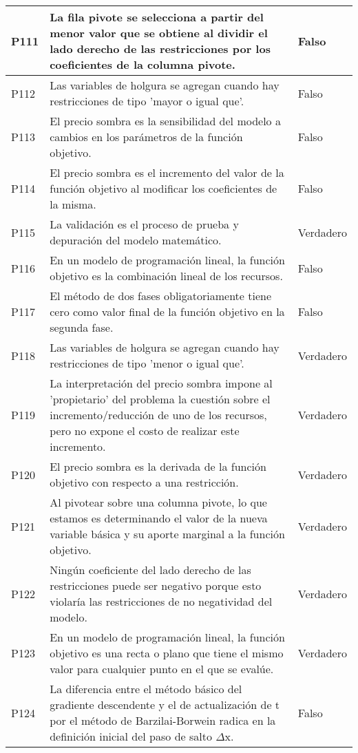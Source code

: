 \documentclass{article}
\begin{document}
\begin{longtable}{|p{1.5cm}|p{14cm}|p{2cm}|}
P111 & La fila pivote se selecciona a partir del menor valor que se obtiene al dividir el lado derecho de las restricciones por los coeficientes de la columna pivote. & Falso \\ \hline
P112 & Las variables de holgura se agregan cuando hay restricciones de tipo 'mayor o igual que'. & Falso \\ \hline
P113 & El precio sombra es la sensibilidad del modelo a cambios en los parámetros de la función objetivo. & Falso \\ \hline
P114 & El precio sombra es el incremento del valor de la función objetivo al modificar los coeficientes de la misma. & Falso \\ \hline
P115 & La validación es el proceso de prueba y depuración del modelo matemático. & Verdadero \\ \hline
P116 & En un modelo de programación lineal, la función objetivo es la combinación lineal de los recursos. & Falso \\ \hline
P117 & El método de dos fases obligatoriamente tiene cero como valor final de la función objetivo en la segunda fase. & Falso \\ \hline
P118 & Las variables de holgura se agregan cuando hay restricciones de tipo 'menor o igual que'. & Verdadero \\ \hline
P119 & La interpretación del precio sombra impone al 'propietario' del problema la cuestión sobre el incremento/reducción de uno de los recursos, pero no expone el costo de realizar este incremento. & Verdadero \\ \hline
P120 & El precio sombra es la derivada de la función objetivo con respecto a una restricción. & Verdadero \\ \hline
P121 & Al pivotear sobre una columna pivote, lo que estamos es determinando el valor de la nueva variable básica y su aporte marginal a la función objetivo. & Verdadero \\ \hline
P122 & Ningún coeficiente del lado derecho de las restricciones puede ser negativo porque esto violaría las restricciones de no negatividad del modelo. & Verdadero \\ \hline
P123 & En un modelo de programación lineal, la función objetivo es una recta o plano que tiene el mismo valor para cualquier punto en el que se evalúe. & Verdadero \\ \hline
P124 & La diferencia entre el método básico del gradiente descendente y el de actualización de t por el método de Barzilai-Borwein radica en la definición inicial del paso de salto $\Delta$x. & Falso \\ \hline

\end{longtable}
\end{document}
